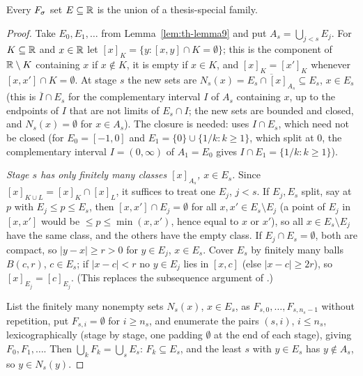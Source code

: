 \begin{lemma}\label{lem:th-lemma10}
Every $F_\sigma$ set $E\subseteq\mathbb{R}$ is the union of a thesis-special family.
\end{lemma}
\begin{proof}
Take $E_0,E_1,\dots$ from Lemma~\ref{lem:th-lemma9} and put $A_s=\bigcup_{j<s}E_j$. For $K\subseteq\mathbb{R}$ and $x\in\mathbb{R}$ let
$[x]_K=\{y:[x,y]\cap K=\emptyset\}$; this is the component of $\mathbb{R}\setminus K$ containing $x$ if $x\notin K$, it is empty if $x\in K$,
and $[x]_K=[x']_K$ whenever $[x,x']\cap K=\emptyset$. At stage $s$ the new sets are $N_s(x)=\overline{E_s\cap[x]_{A_s}}\subseteq E_s$, $x\in E_s$
(this is $\overline I\cap E_s$ for the complementary interval $I$ of $A_s$ containing $x$, up to the endpoints of $I$ that are not limits of
$E_s\cap I$; the new sets are bounded and closed, and $N_s(x)=\emptyset$ for $x\in A_s$). The closure is needed: \cite{Diss}
uses $I\cap E_s$, which need not be closed (for $E_0=[-1,0]$ and $E_1=\{0\}\cup\{1/k:k\ge1\}$, which split at $0$, the complementary
interval $I=(0,\infty)$ of $A_1=E_0$ gives $I\cap E_1=\{1/k:k\ge1\}$).

\emph{Stage $s$ has only finitely many classes $[x]_{A_s}$, $x\in E_s$.} Since $[x]_{K\cup L}=[x]_K\cap[x]_L$, it suffices to treat one
$E_j$, $j<s$. If $E_j,E_s$ split, say at $p$ with $E_j\le p\le E_s$, then $[x,x']\cap E_j=\emptyset$ for all $x,x'\in E_s\setminus E_j$ (a
point of $E_j$ in $[x,x']$ would be $\le p\le\min(x,x')$, hence equal to $x$ or $x'$), so all $x\in E_s\setminus E_j$ have the same class, and the
others have the empty class. If $E_j\cap E_s=\emptyset$, both are compact, so $|y-x|\ge r>0$ for $y\in E_j$, $x\in E_s$. Cover $E_s$ by
finitely many balls $B(c,r)$, $c\in E_s$; if $|x-c|<r$ no $y\in E_j$ lies in $[x,c]$ (else $|x-c|\ge2r$), so $[x]_{E_j}=[c]_{E_j}$.
(This replaces the subsequence argument of \cite{Diss}.)

List the finitely many nonempty sets $N_s(x)$, $x\in E_s$, as $F_{s,0},\dots,F_{s,n_s-1}$ without repetition, put $F_{s,i}=\emptyset$ for
$i\ge n_s$, and enumerate the pairs $(s,i)$, $i\le n_s$, lexicographically (stage by stage, one padding $\emptyset$ at the end of each
stage), giving $F_0,F_1,\dots$. Then $\bigcup_kF_k=\bigcup_sE_s$: $F_k\subseteq E_s$, and the least $s$ with $y\in E_s$ has
$y\notin A_s$, so $y\in N_s(y)$.


\end{proof}
